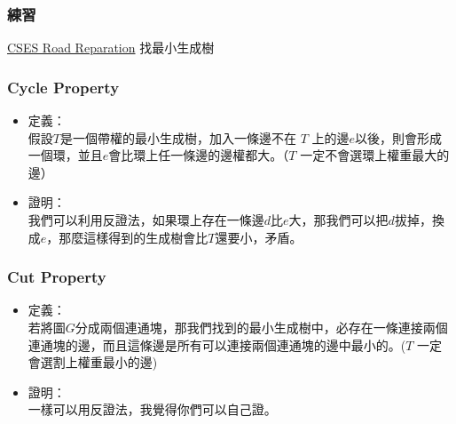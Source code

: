 \documentclass[aspectratio=169]{beamer}
\begin{document}
    \begin{frame}
        \frametitle{練習}
        \begin{block}{\href{https://cses.fi/problemset/task/1675}{CSES Road Reparation}}
        找最小生成樹
        \end{block}
    \end{frame}
    \begin{frame}
        \frametitle{Cycle Property}
        \begin{itemize}
            \item 定義：\\
            假設$T$是一個帶權的最小生成樹，加入一條邊不在 $T$ 上的邊$e$以後，則會形成一個環，並且$e$會比環上任一條邊的邊權都大。（$T$ 一定不會選環上權重最大的邊）
            \item 證明：\\
            我們可以利用反證法，如果環上存在一條邊$d$比$e$大，那我們可以把$d$拔掉，換成$e$，那麼這樣得到的生成樹會比$T$還要小，矛盾。
        \end{itemize}
    \end{frame}
    \begin{frame}
        \frametitle{Cut Property}
        \begin{itemize}
            \item 定義：\\
            若將圖$G$分成兩個連通塊，那我們找到的最小生成樹中，必存在一條連接兩個連通塊的邊，而且這條邊是所有可以連接兩個連通塊的邊中最小的。($T$ 一定會選割上權重最小的邊)
            \item 證明：\\
            一樣可以用反證法，我覺得你們可以自己證。
        \end{itemize}
    \end{frame}
\end{document}
